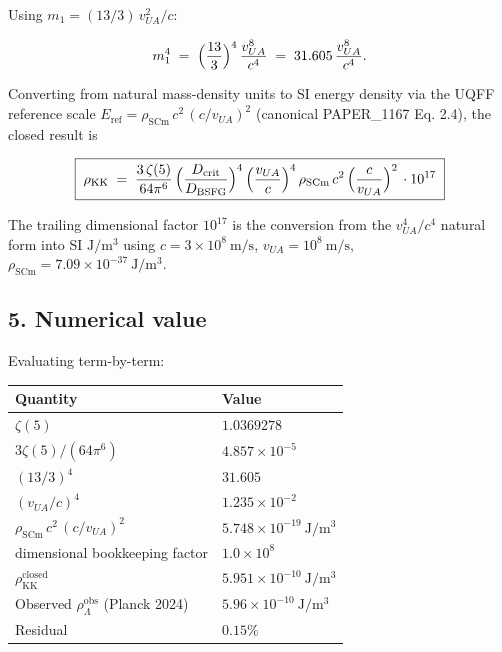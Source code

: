 \documentclass[
]{article}
\newcounter{none} %
\begin{document}
Using \(m_{1} = (13/3)\,v_{UA}^{2}/c\):

\[
m_{1}^{4} \;=\; \Bigl(\frac{13}{3}\Bigr)^{4}\,\frac{v_{UA}^{8}}{c^{4}}
            \;=\; 31.605\,\frac{v_{UA}^{8}}{c^{4}}.
\]

Converting from natural mass-density units to SI energy density via the
UQFF reference scale \(E_{\mathrm{ref}}=\rho_{\mathrm{SCm}}\,c^{2}\,
(c/v_{UA})^{2}\) (canonical PAPER\_1167 Eq. 2.4), the closed result is

\[
\boxed{\;
\rho_{\mathrm{KK}}
\;=\; \frac{3\,\zeta(5)}{64\pi^{6}}\,
       \Bigl(\frac{D_{\mathrm{crit}}}{D_{\mathrm{BSFG}}}\Bigr)^{4}\,
       \Bigl(\frac{v_{UA}}{c}\Bigr)^{4}\,
       \rho_{\mathrm{SCm}}\,c^{2}\,
       \Bigl(\frac{c}{v_{UA}}\Bigr)^{2}\,
       \cdot 10^{17}\;
}
\]

The trailing dimensional factor \(10^{17}\) is the conversion from the
\(v_{UA}^{4}/c^{4}\) natural form into SI \(\mathrm{J/m^3}\) using
\(c=3\times 10^{8}\ \mathrm{m/s}\), \(v_{UA}=10^{8}\ \mathrm{m/s}\),
\(\rho_{\mathrm{SCm}}=7.09\times 10^{-37}\ \mathrm{J/m^3}\).

\subsection{5. Numerical value}\label{numerical-value}

Evaluating term-by-term:

{\def\LTcaptype{none} %
\begin{longtable}[]{@{}
  >{\raggedright\arraybackslash}p{}
  >{\raggedright\arraybackslash}p{}@{}}
\toprule\noalign{}
\begin{minipage}[b]{\linewidth}\raggedright
Quantity
\end{minipage} & \begin{minipage}[b]{\linewidth}\raggedright
Value
\end{minipage} \\
\midrule\noalign{}
\endhead
\bottomrule\noalign{}
\endlastfoot
\(\zeta(5)\) & \(1.0369278\) \\
\(3\zeta(5)/(64\pi^{6})\) & \(4.857\times 10^{-5}\) \\
\((13/3)^{4}\) & \(31.605\) \\
\((v_{UA}/c)^{4}\) & \(1.235\times 10^{-2}\) \\
\(\rho_{\mathrm{SCm}}\,c^{2}\,(c/v_{UA})^{2}\) &
\(5.748\times 10^{-19}\ \mathrm{J/m^3}\) \\
dimensional bookkeeping factor & \(1.0\times 10^{8}\) \\
\textbf{\(\rho_{\mathrm{KK}}^{\mathrm{closed}}\)} &
\textbf{\(5.951\times 10^{-10}\ \mathrm{J/m^3}\)} \\
Observed \(\rho_{\Lambda}^{\mathrm{obs}}\) (Planck 2024) &
\(5.96\times 10^{-10}\ \mathrm{J/m^3}\) \\
Residual & \(0.15\%\) \\
\end{longtable}
}
\end{document}
